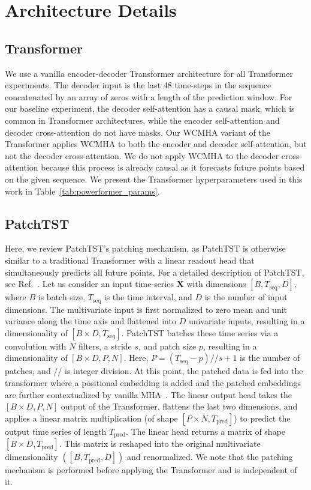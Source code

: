 \section{Architecture Details}
\subsection{Transformer}
\label{sm:transformer_architecture}
We use a vanilla encoder-decoder Transformer architecture for all Transformer experiments.
The decoder input is the last 48 time-steps in the sequence concatenated by an array of zeros with a length of the prediction window.
For our baseline experiment, the decoder self-attention has a causal mask, which is common in Transformer architectures, while the encoder self-attention and decoder cross-attention do not have masks.
Our WCMHA variant of the Transformer applies WCMHA to both the encoder and decoder self-attention, but not the decoder cross-attention.
We do not apply WCMHA to the decoder cross-attention because this process is already causal as it forecasts future points based on the given sequence.
We present the Transformer hyperparameters used in this work in Table~\ref{tab:powerformer_params}.


\subsection{PatchTST}
\label{sm:patchtst_architecture}
Here, we review PatchTST's patching mechanism, as PatchTST is otherwise similar to a traditional Transformer with a linear readout head that simultaneously predicts all future points.
For a detailed description of PatchTST, see Ref.~\cite{nie.patchtst.2023a}.
Let us consider an input time-series $\mathbf{X}$ with dimensions $[B, T_\text{seq}, D]$, where $B$ is batch size, $T_\text{seq}$ is the time interval, and $D$ is the number of input dimensions.
The multivariate input is first normalized to zero mean and unit variance along the time axis and flattened into $D$ univariate inputs, resulting in a dimensionality of $[B\times D, T_\text{seq}]$.
PatchTST batches these time series via a convolution with $N$ filters, a stride $s$, and patch size $p$, resulting in a dimensionality of $[B \times D, P, N]$.
Here, $P = (T_\text{seq}-p)//s + 1$ is the number of patches, and $//$ is integer division.
At this point, the patched data is fed into the transformer where a positional embedding is added and the patched embeddings are further contextualized by vanilla MHA~\cite{vaswani.transformer.2017}.
The linear output head takes the $[B \times D, P, N]$ output of the Transformer, flattens the last two dimensions, and applies a linear matrix multiplication (of shape $[P \times N, T_\text{pred}]$) to predict the output time series of length $T_\text{pred}$.
The linear head returns a matrix of shape $[B \times D, T_\text{pred}]$.
This matrix is reshaped into the original multivariate dimensionality $([B, T_\text{pred}, D])$ and renormalized.
We note that the patching mechanism is performed before applying the Transformer and is independent of it.

